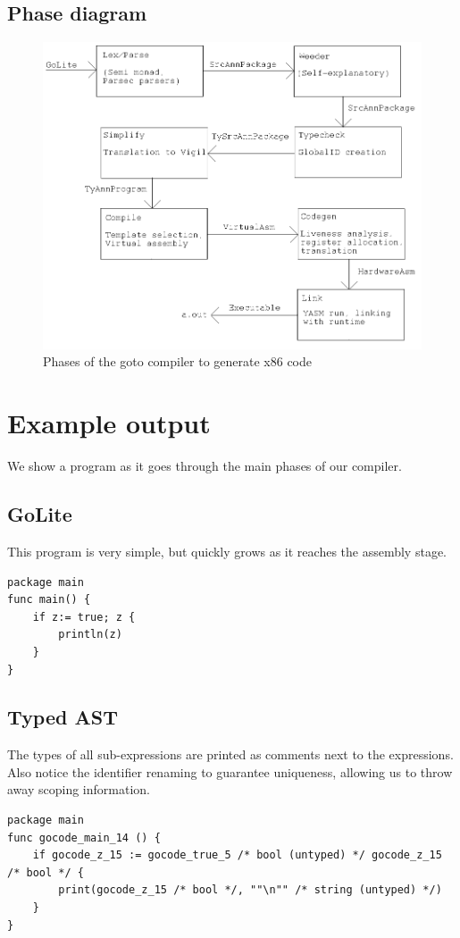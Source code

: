 \documentclass[letterpaper,11pt]{article}
\begin{document}
\subsection{Phase diagram}
\begin{figure}[ht]
\begin{center}
\includegraphics[width=.6\textwidth]{diagram.png}
\end{center}
\caption{Phases of the goto compiler to generate x86 code}
\end{figure}

\section{Example output}
\label{sec:eg}
We show a program as it goes through the main phases of our compiler.
\subsection{GoLite}
This program is very simple, but quickly grows as it reaches the assembly stage.
\begin{verbatim}
package main
func main() {
    if z:= true; z {
        println(z)
    }
}
\end{verbatim}

\subsection{Typed AST}
The types of all sub-expressions are printed as comments next to the expressions. Also notice the identifier renaming to guarantee uniqueness, allowing us to throw away scoping information.
\begin{verbatim}
package main
func gocode_main_14 () {
    if gocode_z_15 := gocode_true_5 /* bool (untyped) */ gocode_z_15 /* bool */ {
        print(gocode_z_15 /* bool */, ""\n"" /* string (untyped) */)
    }
}
\end{verbatim}
\end{document}
